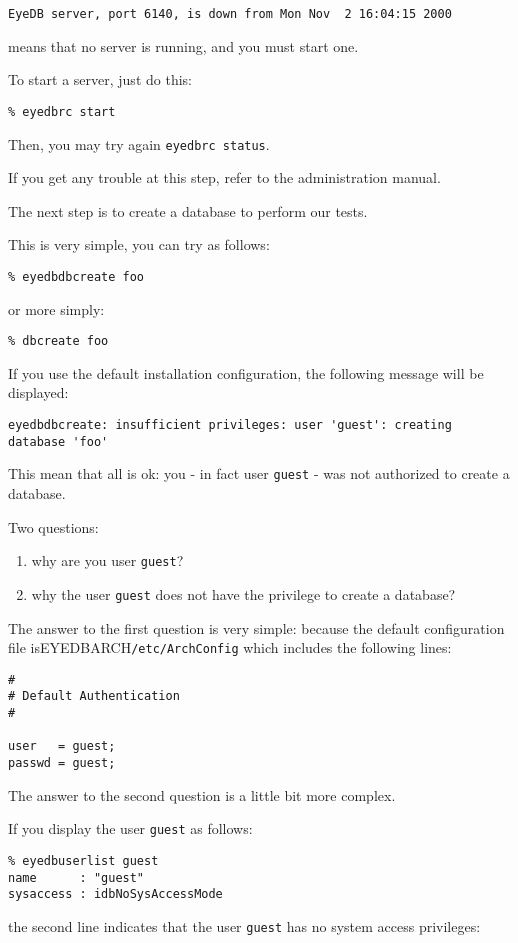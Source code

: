 \verbsize \begin{verbatim}
EyeDB server, port 6140, is down from Mon Nov  2 16:04:15 2000
\end{verbatim}
\normalsize
means that no \eyedb server is running, and you must start one.

To start a server, just do this:
\verbsize \begin{verbatim}
% eyedbrc start
\end{verbatim}
\normalsize

Then, you may try again \texttt{eyedbrc status}.

If you get any trouble at this step, refer to the administration manual.

The next step is to create a database to perform our tests.

This is very simple, you can try as follows:
\verbsize
\begin{verbatim}
% eyedbdbcreate foo
\end{verbatim}
or more simply:
\begin{verbatim}
% dbcreate foo
\end{verbatim}
\normalsize
If you use the default installation configuration, the following message
will be displayed:
\verbsize \begin{verbatim}
eyedbdbcreate: insufficient privileges: user 'guest': creating database 'foo'
\end{verbatim}
\normalsize
This mean that all is ok: you - in fact user \texttt{guest} - was not
authorized to create a database.


Two questions: 
\begin{enumerate}
\item why are you user \texttt{guest}? 
\item why the user \texttt{guest} does not have the privilege to create a database? 
\end{enumerate}

The answer to the first question is very simple: because the default
configuration file is{EYEDBARCH}\texttt{/etc/ArchConfig}
which includes the following lines:
\verbsize \begin{verbatim}
#
# Default Authentication
#
 
user   = guest;
passwd = guest;
\end{verbatim}
\normalsize
The answer to the second question is a little bit more complex.

If you display the user \texttt{guest} as follows:
\verbsize \begin{verbatim}
% eyedbuserlist guest
name      : "guest"
sysaccess : idbNoSysAccessMode
\end{verbatim}
\normalsize
the second line indicates that the user \texttt{guest} has no system access
privileges:


